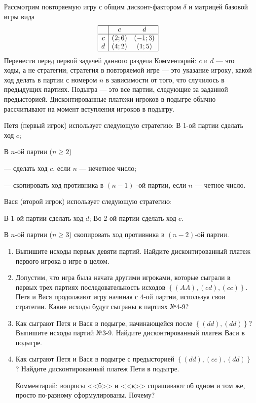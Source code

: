 \begin{problem}

Рассмотрим повторяемую игру с общим дисконт-фактором  $\delta $  и матрицей базовой игры вида
\[\begin{array}{|c|cc|}  \hline {} & {c} & {d} \\  \hline {c} & (2;6) & (-1;3) \\ {d} & (4;2) & (1;5) \\  \hline  \end{array}\]
{\red Перенести перед первой задачей данного раздела} Комментарий:  $c$  и  $d$  --- это ходы, а не стратегии; стратегия в повторяемой игре --- это указание игроку, какой ход делать в партии с номером  $n$  в зависимости от того, что случилось в предыдущих партиях.
Подыгра --- это все партии, следующие за заданной предысторией. Дисконтированные платежи игроков в подыгре обычно рассчитывают на момент вступления игроков в подыгру.\par
Петя (первый игрок) использует следующую стратегию:
В 1-ой партии сделать ход  $c$;\par
В  $n$-ой партии ($n\ge 2$)\par
       --- сделать ход  $c$, если  $n$  --- нечетное число;\par
       --- скопировать ход противника в  $\left(n-1\right)$ -ой партии, если  $n$  --- четное число.\par
Вася (второй игрок) использует следующую стратегию:\par
В 1-ой партии сделать ход  $d$; Во 2-ой партии сделать ход  $c$.\par
В  $n$-ой партии ($n\ge 3$) скопировать ход противника в  $\left(n-2\right)$-ой партии.\par
\begin{enumerate}
\item      Выпишите исходы первых девяти партий. Найдите дисконтированный платеж первого игрока в игре в целом.\par
\item      Допустим, что игра была начата другими игроками, которые сыграли в первых трех партиях последовательность исходов  $\left\{\left(AA\right),\left(cd\right),\left(cc\right)\right\}$. Петя и Вася продолжают игру начиная с 4-ой партии, используя свои стратегии. Какие исходы будут сыграны в партиях №4-9?\par
\item       Как сыграют Петя и Вася в подыгре, начинающейся после  $\left\{\left(dd\right),\left(dd\right)\right\}$? Выпишите исходы партий №3-9. Найдите дисконтированный платеж Васи в подыгре.\par
\item      Как сыграют Петя и Вася в подыгре с предысторией  $\left\{\left(dd\right),\left(cc\right),\left(dd\right)\right\}$? Найдите дисконтированный платеж Пети в подыгре.\par
Комментарий: вопросы <<б>> и <<в>> спрашивают об одном и том же, просто по-разному сформулированы. {\red Почему?}
\end{enumerate}


\end{problem}

